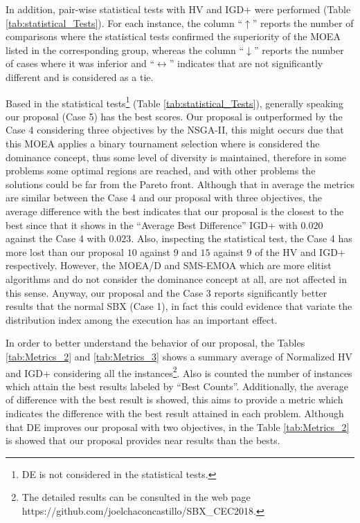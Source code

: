 In addition, pair-wise statistical tests with HV and IGD+ were performed (Table \ref{tab:statistical_Tests}).
%
For each instance, the column ``$\uparrow$'' reports the number of comparisons where the statistical tests confirmed the superiority of the MOEA listed in the corresponding group, whereas the column ``$\downarrow$'' reports the number of cases where it was inferior and ``$\longleftrightarrow$'' indicates that are not significantly different and is considered as a tie.


Based in the statistical tests\footnote{DE is not considered in the statistical tests.} (Table \ref{tab:statistical_Tests}), generally speaking our proposal (Case 5) has the best scores.
%
Our proposal is outperformed by the Case 4 considering three objectives by the NSGA-II, this might occurs due that this MOEA applies a binary tournament selection where is considered the dominance concept, thus some level of diversity is maintained, therefore in some problems some optimal regions are reached, and with other problems the solutions could be far from the Pareto front.
%
Although that in average the metrics are similar between the Case 4 and our proposal with three objectives, the average difference with the best indicates that our proposal is the closest to the best since that it shows in the ``Average Best Difference'' IGD+ with $0.020$ against the Case 4 with $0.023$.
%
Also, inspecting the statistical test, the Case 4 has more lost than our proposal $10$ against $9$ and $15$ against $9$ of the HV and IGD+ respectively.
%
However, the MOEA/D and SMS-EMOA which are more elitist algorithms and do not consider the dominance concept at all, are not affected in this sense.
%
Anyway, our proposal and the Case 3 reports significantly better results that the normal SBX (Case 1), in fact this could evidence that variate the distribution index among the execution has an important effect.


In order to better understand the behavior of our proposal, the Tables \ref{tab:Metrics_2} and \ref{tab:Metrics_3} shows a summary average of Normalized HV and IGD+ considering all the instances\footnote{The detailed results can be consulted in the web page https:\//\//github.com\//joelchaconcastillo\//SBX\_CEC2018.}.
%
Also is counted the number of instances which attain the best results labeled by ``Best Counts''.
%
Additionally, the average of difference with the best result is showed, this aims to provide a metric which indicates the difference with the best result attained in each problem.
%
Although that DE improves our proposal with two objectives, in the Table \ref{tab:Metrics_2}  is showed that our proposal provides near results than the bests.
%

